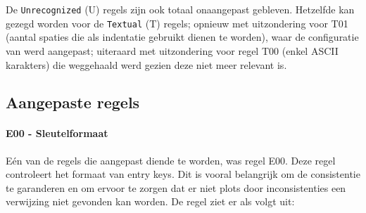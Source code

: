 De \texttt{Unrecognized} (U) regels zijn ook totaal onaangepast gebleven. Hetzelfde kan gezegd worden voor de \texttt{Textual} (T) regels; opnieuw met uitzondering voor T01 (aantal spaties die als indentatie gebruikt dienen te worden), waar de configuratie van werd aangepast; uiteraard met uitzondering voor regel T00 (enkel ASCII karakters) die weggehaald werd gezien deze niet meer relevant is.

\subsection{Aangepaste regels}
\paragraph{E00 - Sleutelformaat}
\label{rule:E00}
Eén van de regels die aangepast diende te worden, was regel E00. Deze regel controleert het formaat van entry keys. Dit is vooral belangrijk om de consistentie te garanderen en om ervoor te zorgen dat er niet plots door inconsistenties een verwijzing niet gevonden kan worden. De regel ziet er als volgt uit:

